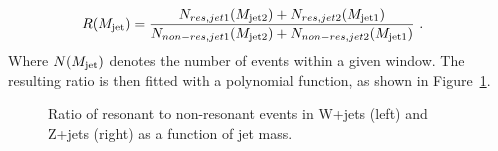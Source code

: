 \begin{align}
R(M_{\rm jet}) &= \frac{N_{res,jet1}(M_{\rm jet2})+N_{res,jet2}(M_{\rm jet1})}{N_{non-res,jet1}(M_{\rm jet2}) + N_{non-res,jet2}(M_{\rm jet1})}~.
\end{align}
Where $N(M_{\rm jet})$ denotes the number of events within a given \MJ window. The resulting ratio is then fitted with a polynomial function, as shown in Figure~\ref{fig:ratio_Vjets}.
\begin{figure}[h]
\centering
{}
\caption{Ratio of resonant to non-resonant events in  W+jets (left) and Z+jets (right) as a function of jet mass.}
\label{fig:ratio_Vjets}
\end{figure}
